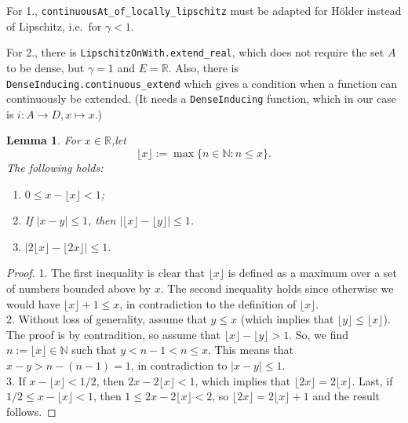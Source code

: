 \documentclass{article}
\newtheorem{lemma}[proposition]{Lemma}
\theoremstyle{definition}
\theoremstyle{step} \newtheorem{step}{Step}
\newcommand{\leanline}[1]{\texttt{#1}}%
\begin{document}
For 1., \leanline{continuousAt_of_locally_lipschitz} must be adapted
for Hölder instead of Lipschitz, i.e.\ for $\gamma<1$.

For 2., there is \leanline{LipschitzOnWith.extend_real}, which does
not require the set $A$ to be dense, but $\gamma=1$ and $E=\mathbb R$.
Also, there is \leanline{DenseInducing.continuous_extend} which gives
a condition when a function can continuously be extended. (It needs a
\leanline{DenseInducing} function, which in our case is $i : A \to D,
x\mapsto x$.)


\begin{lemma}\label{l:gauss}
  For $x\in\mathbb R$,let
  $$ \lfloor x \rfloor := \max\{n \in \mathbb N: n\leq x\}.$$ The
  following holds:
  \begin{enumerate}
  \item $0\leq x - \lfloor x \rfloor < 1$;
  \item   If $|x-y| \leq 1$, then $|\lfloor x\rfloor - \lfloor y \rfloor| \leq
    1$. 
  \item $|2 \lfloor x\rfloor - \lfloor 2x \rfloor| \leq 1$.
  \end{enumerate}
\end{lemma}

\begin{proof}
  1. The first inequality is clear that $\lfloor x\rfloor$ is defined
  as a maximum over a set of numbers bounded above by $x$. The second
  inequality holds since otherwise we would have $\lfloor x\rfloor + 1
  \leq x$, in contradiction to the definition of $\lfloor
  x\rfloor$. \\ 2. Without loss of generality, assume that $y\leq x$
  (which implies that $\lfloor y \rfloor \leq \lfloor x\rfloor$). The
  proof is by contradition, so assume that $\lfloor x\rfloor - \lfloor
  y \rfloor > 1$. So, we find $n := \lfloor x\rfloor\in\mathbb N$ such
  that $y < n-1 < n \leq x$. This means that $x-y > n - (n-1) = 1$, in
  contradiction to $|x-y| \leq 1$.  \\ 3.  If $x - \lfloor x\rfloor <
  1/2$, then $2x - 2 \lfloor x\rfloor < 1$, which implies that
  $\lfloor 2x\rfloor = 2\lfloor x\rfloor$. Last, if $1/2 \leq x -
  \lfloor x\rfloor < 1$, then $1 \leq 2x - 2\lfloor x\rfloor < 2$, so
  $\lfloor 2x\rfloor = 2\lfloor x\rfloor +1$ and the result follows.
\end{proof}
\end{document}
